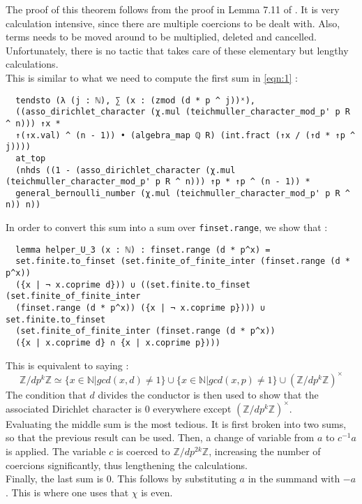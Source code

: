 \documentclass[11pt]{article}
\newcommand{\lean}[1]{\texttt{#1}\xspace} %
\begin{document}
The proof of this theorem follows from the proof in Lemma 7.11 of \cite{cyc}. It is very calculation intensive, since there are multiple 
coercions to be dealt with. Also, terms needs to be moved around to be multiplied, deleted and cancelled. Unfortunately, there is no tactic 
that takes care of these elementary but lengthy calculations. \\

This is similar to what we need to compute the first sum in \eqref{eqn:1} :
\begin{lstlisting}
  tendsto (λ (j : ℕ), ∑ (x : (zmod (d * p ^ j))ˣ),
  ((asso_dirichlet_character (χ.mul (teichmuller_character_mod_p' p R ^ n))) ↑x *
  ↑(↑x.val) ^ (n - 1)) • (algebra_map ℚ R) (int.fract (↑x / (↑d * ↑p ^ j))))
  at_top
  (nhds ((1 - (asso_dirichlet_character (χ.mul (teichmuller_character_mod_p' p R ^ n))) ↑p * ↑p ^ (n - 1)) *
  general_bernoulli_number (χ.mul (teichmuller_character_mod_p' p R ^ n)) n))
\end{lstlisting}

In order to convert this sum into a sum over \lean{finset.range}, we show that :
\begin{lstlisting}
  lemma helper_U_3 (x : ℕ) : finset.range (d * p^x) = 
  set.finite.to_finset (set.finite_of_finite_inter (finset.range (d * p^x)) 
  ({x | ¬ x.coprime d})) ∪ ((set.finite.to_finset (set.finite_of_finite_inter 
  (finset.range (d * p^x)) ({x | ¬ x.coprime p}))) ∪ set.finite.to_finset 
  (set.finite_of_finite_inter (finset.range (d * p^x)) 
  ({x | x.coprime d} ∩ {x | x.coprime p}))) 
\end{lstlisting}

This is equivalent to saying :
$$ \mathbb{Z} / d p^k \mathbb{Z} \simeq \{ x \in \mathbb{N} | gcd (x, d) \ne 1 \} \cup \{ x \in \mathbb{N} | gcd (x, p) \ne 1 \} 
\cup (\mathbb{Z} / d p^k \mathbb{Z})^{\times} $$
The condition that $d$ divides the conductor is then used to show that the associated Dirichlet character is 0 everywhere except 
$(\mathbb{Z} / d p^k \mathbb{Z})^{\times}$. \\

Evaluating the middle sum is the most tedious. It is first broken into two sums, so that the previous result can be used. Then, a 
change of variable from $a$ to $c^{-1} a$ is applied. The variable $c$ is coerced to $\mathbb{Z}/ d p^{2k} \mathbb{Z}$, increasing 
the number of coercions significantly, thus lengthening the calculations. \\

Finally, the last sum is 0. This follows by substituting $a$ in the summand with $-a$. This is where one uses that $\chi$ is even. \\
\end{document}
